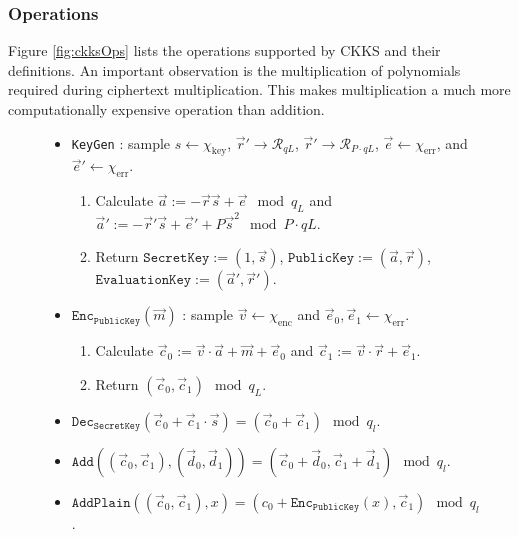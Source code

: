 \subsubsection{Operations}
\setlength{\leftskip}{0.5cm}
\indent \indent
Figure \ref{fig:ckksOps} lists the operations supported by CKKS and their definitions. An important observation is the multiplication of polynomials required during ciphertext multiplication. This makes multiplication a much more computationally expensive operation than addition.
\begin{figure}[ht]
    \centering
    \begin{tcolorbox}
        \begin{itemize}[leftmargin=0.1cm]
            \item \texttt{KeyGen} : sample $s \leftarrow \chi_{\text{key}}$, $\vec{r}' \rightarrow \mathcal{R}_{qL}$, $\vec{r}' \rightarrow \mathcal{R}_{P \cdot qL}$, $\vec{e} \leftarrow \chi_{\text{err}}$, and $\vec{e}' \leftarrow \chi_{\text{err}}$.
            \begin{enumerate}
                \item Calculate $\vec{a} := - \vec{r} \vec{s} + \vec{e} \mod q_L$ and $\vec{a}' := -\vec{r}' \vec{s} + \vec{e}' + P \vec{s}^2 \mod P \cdot qL$.
                \item Return $\texttt{SecretKey} := (1, \vec{s})$, $\texttt{PublicKey} := (\vec{a}, \vec{r})$, $\texttt{EvaluationKey} := (\vec{a}', \vec{r}')$.
            \end{enumerate}
            \item $\texttt{Enc}_\texttt{PublicKey}(\vec{m})$ : sample $\vec{v} \leftarrow \chi_{\text{enc}}$ and $\vec{e}_0, \vec{e}_1 \leftarrow \chi_{\text{err}}$.
            \begin{enumerate}
                \item Calculate $\vec{c}_0 := \vec{v} \cdot \vec{a} + \vec{m} + \vec{e}_0$ and $\vec{c}_1 := \vec{v} \cdot \vec{r} + \vec{e}_1$.
                \item Return $(\vec{c}_0, \vec{c}_1) \mod q_L$.
            \end{enumerate}
            \item $\texttt{Dec}_\texttt{SecretKey}(\vec{c}_0 + \vec{c}_1 \cdot \vec{s}) = (\vec{c}_0 + \vec{c}_1) \mod q_l$.
            \item $\texttt{Add}((\vec{c}_0, \vec{c}_1), (\vec{d}_0, \vec{d}_1)) = (\vec{c}_0 + \vec{d}_0, \vec{c}_1 + \vec{d}_1) \mod q_l$.
            \item $\texttt{AddPlain}((\vec{c}_0, \vec{c}_1), x) = (c_0 + \texttt{Enc}_\texttt{PublicKey}(x), \vec{c}_1) \mod q_l$.

\end{itemize}
\end{tcolorbox}
\end{figure}
